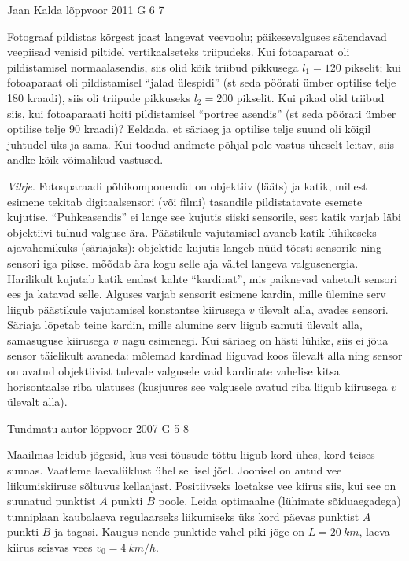 \documentclass[11pt]{article}
\begin{document}
{%
{Jaan Kalda} %
{lõppvoor} %
{2011} %
{G 6} %
{7} %
{
\ifStatement
Fotograaf pildistas kõrgest joast langevat veevoolu; päikesevalguses sätendavad veepiisad venisid piltidel vertikaalseteks triipudeks.
Kui fotoaparaat oli pildistamisel normaalasendis, siis olid kõik triibud pikkusega $l_1 = \num{120}$ pikselit; kui fotoaparaat oli pildistamisel \enquote{jalad ülespidi} (st seda
pöörati ümber optilise telje \num{180} kraadi), siis oli triipude pikkuseks $l_2 = \num{200}$
pikselit. Kui pikad olid triibud siis, kui fotoaparaati hoiti pildistamisel \enquote{portree
asendis} (st seda pöörati ümber optilise telje \num{90} kraadi)? Eeldada, et säriaeg
ja optilise telje suund oli kõigil juhtudel üks ja sama. Kui toodud andmete
põhjal pole vastus üheselt leitav, siis andke kõik võimalikud vastused.

\emph{Vihje}. 
Fotoaparaadi põhikomponendid on objektiiv (lääts) ja katik, millest
esimene tekitab digitaalsensori (või filmi) tasandile pildistatavate esemete kujutise. \enquote{Puhkeasendis} ei lange see kujutis siiski sensorile, sest katik varjab
läbi objektiivi tulnud valguse ära. Päästikule vajutamisel avaneb katik lühikeseks ajavahemikuks (säriajaks): objektide kujutis langeb nüüd tõesti sensorile
ning sensori iga piksel mõõdab ära kogu selle aja vältel langeva valgusenergia.
Harilikult kujutab katik endast kahte \enquote{kardinat}, mis paiknevad vahetult sensori ees ja katavad selle. Alguses varjab sensorit esimene kardin, mille ülemine
serv liigub päästikule vajutamisel konstantse kiirusega $v$ ülevalt alla, avades
sensori. Säriaja lõpetab teine kardin, mille alumine serv liigub samuti ülevalt
alla, samasuguse kiirusega $v$ nagu esimenegi. Kui säriaeg on hästi lühike, siis
ei jõua sensor täielikult avaneda: mõlemad kardinad liiguvad koos ülevalt alla
ning sensor on avatud objektiivist tulevale valgusele vaid kardinate vahelise
kitsa horisontaalse riba ulatuses (kusjuures see valgusele avatud riba liigub
kiirusega $v$ ülevalt alla).
\fi
}

{Tundmatu autor} %
{lõppvoor} %
{2007} %
{G 5} %
{8} %
{
\ifStatement
Maailmas leidub jõgesid, kus vesi tõusude tõttu liigub kord ühes, kord teises suunas. Vaatleme laevaliiklust ühel sellisel jõel. Joonisel on antud vee liikumiskiiruse sõltuvus kellaajast. Positiivseks loetakse vee kiirus siis, kui see on suunatud punktist $A$ punkti $B$ poole. Leida optimaalne (lühimate sõiduaegadega) tunniplaan kaubalaeva regulaarseks liikumiseks üks kord päevas punktist $A$ punkti $B$ ja tagasi. Kaugus nende punktide vahel piki jõge on $L = \SI{20}{km}$, laeva kiirus seisvas vees $v_0 = \SI{4}{km/h}$.

}}
\end{document}
